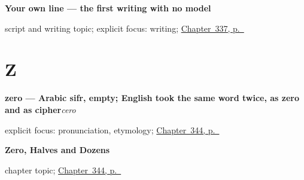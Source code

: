 \noindent\begin{minipage}[t]{\linewidth}
\raggedright
\textbf{Your own line — the first writing with no model}\par
\footnotesize script and writing topic; explicit focus: writing; \hyperref[ch:escribir-frase-propia]{Chapter~337, p.~\pageref*{ch:escribir-frase-propia}}
\end{minipage}\par\smallskip

\section*{Z}

\noindent\begin{minipage}[t]{\linewidth}
\raggedright
\textbf{zero — Arabic sifr, empty; English took the same word twice, as zero and as cipher}\enspace\emph{cero}\par
\footnotesize explicit focus: pronunciation, etymology; \hyperref[ch:cero-y-mitad]{Chapter~344, p.~\pageref*{ch:cero-y-mitad}}
\end{minipage}\par\smallskip

\noindent\begin{minipage}[t]{\linewidth}
\raggedright
\textbf{Zero, Halves and Dozens}\par
\footnotesize chapter topic; \hyperref[ch:cero-y-mitad]{Chapter~344, p.~\pageref*{ch:cero-y-mitad}}
\end{minipage}\par\smallskip
